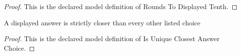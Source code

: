 \begin{proof}
  This is the declared model definition of Rounds To Displayed Tenth.
\end{proof}
\begin{definition}
  \label{def:physics:phyx-mini-0284:phyxminiproblems-problemphyxmini0284-isuniqueclosestanswerchoice}
  A displayed answer is strictly closer than every other listed choice
\end{definition}
\begin{proof}
  This is the declared model definition of Is Unique Closest Answer Choice.
\end{proof}
